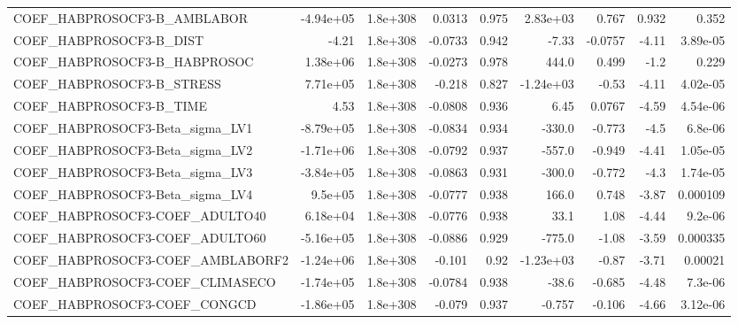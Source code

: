 \begin{tabular}{lrrrrrrrr}
COEF\_HABPROSOCF3-B\_AMBLABOR       &   -4.94e+05 &     1.8e+308 &  0.0313 &    0.975 &   2.83e+03 &       0.767 &        0.932 &         0.352 \\
COEF\_HABPROSOCF3-B\_DIST           &       -4.21 &     1.8e+308 & -0.0733 &    0.942 &      -7.33 &     -0.0757 &        -4.11 &      3.89e-05 \\
COEF\_HABPROSOCF3-B\_HABPROSOC      &    1.38e+06 &     1.8e+308 & -0.0273 &    0.978 &      444.0 &       0.499 &         -1.2 &         0.229 \\
COEF\_HABPROSOCF3-B\_STRESS         &    7.71e+05 &     1.8e+308 &  -0.218 &    0.827 &  -1.24e+03 &       -0.53 &        -4.11 &      4.02e-05 \\
COEF\_HABPROSOCF3-B\_TIME           &        4.53 &     1.8e+308 & -0.0808 &    0.936 &       6.45 &      0.0767 &        -4.59 &      4.54e-06 \\
COEF\_HABPROSOCF3-Beta\_sigma\_LV1   &   -8.79e+05 &     1.8e+308 & -0.0834 &    0.934 &     -330.0 &      -0.773 &         -4.5 &       6.8e-06 \\
COEF\_HABPROSOCF3-Beta\_sigma\_LV2   &   -1.71e+06 &     1.8e+308 & -0.0792 &    0.937 &     -557.0 &      -0.949 &        -4.41 &      1.05e-05 \\
COEF\_HABPROSOCF3-Beta\_sigma\_LV3   &   -3.84e+05 &     1.8e+308 & -0.0863 &    0.931 &     -300.0 &      -0.772 &         -4.3 &      1.74e-05 \\
COEF\_HABPROSOCF3-Beta\_sigma\_LV4   &     9.5e+05 &     1.8e+308 & -0.0777 &    0.938 &      166.0 &       0.748 &        -3.87 &      0.000109 \\
COEF\_HABPROSOCF3-COEF\_ADULTO40    &    6.18e+04 &     1.8e+308 & -0.0776 &    0.938 &       33.1 &        1.08 &        -4.44 &       9.2e-06 \\
COEF\_HABPROSOCF3-COEF\_ADULTO60    &   -5.16e+05 &     1.8e+308 & -0.0886 &    0.929 &     -775.0 &       -1.08 &        -3.59 &      0.000335 \\
COEF\_HABPROSOCF3-COEF\_AMBLABORF2  &   -1.24e+06 &     1.8e+308 &  -0.101 &     0.92 &  -1.23e+03 &       -0.87 &        -3.71 &       0.00021 \\
COEF\_HABPROSOCF3-COEF\_CLIMASECO   &   -1.74e+05 &     1.8e+308 & -0.0784 &    0.938 &      -38.6 &      -0.685 &        -4.48 &       7.3e-06 \\
COEF\_HABPROSOCF3-COEF\_CONGCD      &   -1.86e+05 &     1.8e+308 &  -0.079 &    0.937 &     -0.757 &      -0.106 &        -4.66 &      3.12e-06 \\

\end{tabular}
